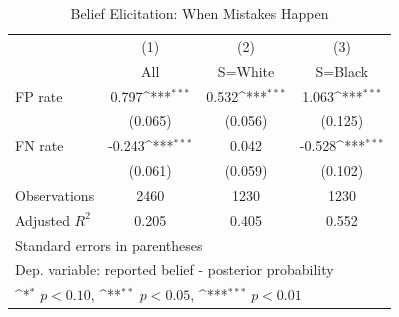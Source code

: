 \begin{table}[htbp]\centering
\def\sym#1{\ifmmode^{#1}\else\(^{#1}\)\fi}
\caption{Belief Elicitation: When Mistakes Happen}
\begin{tabular}{l*{3}{c}}
\hline\hline
                &\multicolumn{1}{c}{(1)}&\multicolumn{1}{c}{(2)}&\multicolumn{1}{c}{(3)}\\
                &\multicolumn{1}{c}{All}&\multicolumn{1}{c}{S=White}&\multicolumn{1}{c}{S=Black}\\
\hline
FP rate         &    0.797\sym{***}&    0.532\sym{***}&    1.063\sym{***}\\
                &  (0.065)         &  (0.056)         &  (0.125)         \\
FN rate         &   -0.243\sym{***}&    0.042         &   -0.528\sym{***}\\
                &  (0.061)         &  (0.059)         &  (0.102)         \\
\hline
Observations    &     2460         &     1230         &     1230         \\
Adjusted \(R^{2}\)&    0.205         &    0.405         &    0.552         \\
\hline\hline
\multicolumn{4}{l}{\footnotesize Standard errors in parentheses}\\
\multicolumn{4}{l}{\footnotesize Dep. variable: reported belief - posterior probability}\\
\multicolumn{4}{l}{\footnotesize \sym{*} \(p<0.10\), \sym{**} \(p<0.05\), \sym{***} \(p<0.01\)}\\
\end{tabular}
\end{table}

